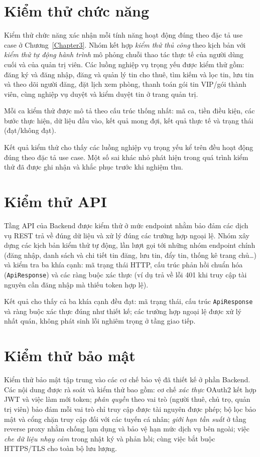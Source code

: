 \section{Kiểm thử chức năng}

Kiểm thử chức năng xác nhận mỗi tính năng hoạt động đúng theo đặc tả use case ở Chương~\ref{Chapter3}. Nhóm kết hợp \textit{kiểm thử thủ công} theo kịch bản với \textit{kiểm thử tự động hành trình} mô phỏng chuỗi thao tác thực tế của người dùng cuối và của quản trị viên. Các luồng nghiệp vụ trọng yếu được kiểm thử gồm: đăng ký và đăng nhập, đăng và quản lý tin cho thuê, tìm kiếm và lọc tin, lưu tin và theo dõi người đăng, đặt lịch xem phòng, thanh toán gói tin VIP/gói thành viên, cùng nghiệp vụ duyệt và kiểm duyệt tin ở trang quản trị.

Mỗi ca kiểm thử được mô tả theo cấu trúc thống nhất: mã ca, tiền điều kiện, các bước thực hiện, dữ liệu đầu vào, kết quả mong đợi, kết quả thực tế và trạng thái (đạt/không đạt).

Kết quả kiểm thử cho thấy các luồng nghiệp vụ trọng yếu kể trên đều hoạt động đúng theo đặc tả use case. Một số sai khác nhỏ phát hiện trong quá trình kiểm thử đã được ghi nhận và khắc phục trước khi nghiệm thu.

\section{Kiểm thử API}

Tầng API của Backend được kiểm thử ở mức endpoint nhằm bảo đảm các dịch vụ REST trả về đúng dữ liệu và xử lý đúng các trường hợp ngoại lệ. Nhóm xây dựng các kịch bản kiểm thử tự động, lần lượt gọi tới những nhóm endpoint chính (đăng nhập, danh sách và chi tiết tin đăng, lưu tin, đẩy tin, thống kê trang chủ\ldots) và kiểm tra ba khía cạnh: mã trạng thái HTTP, cấu trúc phản hồi chuẩn hóa (\texttt{ApiResponse}) và các ràng buộc xác thực (ví dụ trả về lỗi 401 khi truy cập tài nguyên cần đăng nhập mà thiếu token hợp lệ).

Kết quả cho thấy cả ba khía cạnh đều đạt: mã trạng thái, cấu trúc \texttt{ApiResponse} và ràng buộc xác thực đúng như thiết kế; các trường hợp ngoại lệ được xử lý nhất quán, không phát sinh lỗi nghiêm trọng ở tầng giao tiếp.

\section{Kiểm thử bảo mật}

Kiểm thử bảo mật tập trung vào các cơ chế bảo vệ đã thiết kế ở phần Backend. Các nội dung được rà soát và kiểm thử bao gồm: cơ chế \textit{xác thực} OAuth2 kết hợp JWT và việc làm mới token; \textit{phân quyền} theo vai trò (người thuê, chủ trọ, quản trị viên) bảo đảm mỗi vai trò chỉ truy cập được tài nguyên được phép; bộ lọc bảo mật và cổng chặn truy cập đối với các tuyến cá nhân; \textit{giới hạn tần suất} ở tầng reverse proxy nhằm chống lạm dụng và bảo vệ hạn mức dịch vụ bên ngoài; việc \textit{che dữ liệu nhạy cảm} trong nhật ký và phản hồi; cùng việc bắt buộc HTTPS/TLS cho toàn bộ lưu lượng.

